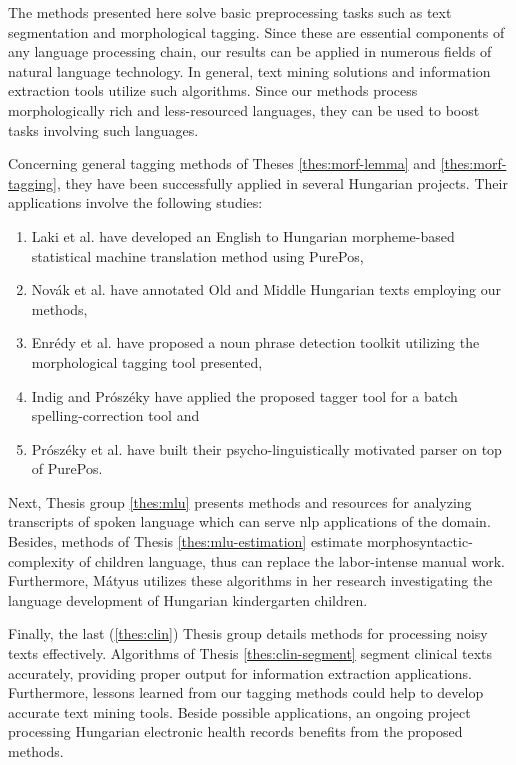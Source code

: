 
The methods presented here solve basic preprocessing tasks such as text segmentation and morphological tagging. 
Since these are essential components of any language processing chain, our results can be applied in numerous fields of natural language technology. 
In general, text mining solutions and information extraction tools utilize such algorithms.
Since our methods process morphologically rich and less-resourced languages, they can be used to boost tasks involving such languages.

Concerning general tagging methods of Theses \ref{thes:morf-lemma} and \ref{thes:morf-tagging}, they have been successfully applied in several Hungarian projects.
Their applications involve the following studies:
\begin{enumerate}
\item Laki et al. \cite{Laki2013} have developed an English to Hungarian morpheme-based statistical machine translation method using PurePos,
\item Novák et al. \cite{Novak2013} have annotated Old and Middle Hungarian texts employing our methods,
\item Enrédy et al. \cite{Endredy2014} have proposed a noun phrase detection toolkit utilizing the morphological tagging tool presented,
\item Indig and Prószéky have applied \cite{Indig2013} the proposed tagger tool for a batch spelling-correction tool and
\item Prószéky et al. \cite{Proszeky2014} have built their psycho-linguistically motivated parser on top of PurePos.
\end{enumerate}

Next, Thesis group \ref{thes:mlu} presents methods and resources for analyzing transcripts of spoken language which can serve \acrshort{nlp} applications of the domain.
Besides, methods of Thesis \ref{thes:mlu-estimation} estimate morphosyntactic-complexity of children language, thus can replace the labor-intense manual work.
Furthermore, Mátyus utilizes \cite{Matyus2014b} these algorithms in her research investigating the language development of Hungarian kindergarten children.

Finally, the last (\ref{thes:clin}) Thesis group details methods for processing noisy texts effectively.
Algorithms of Thesis \ref{thes:clin-segment} segment clinical texts accurately, providing proper output for information extraction applications. 
Furthermore, lessons learned from our tagging methods could help to develop accurate text mining tools.
Beside possible applications, an ongoing project \cite{Siklosi2014,Siklosi2014mszny} processing Hungarian electronic health records benefits from the proposed methods.


